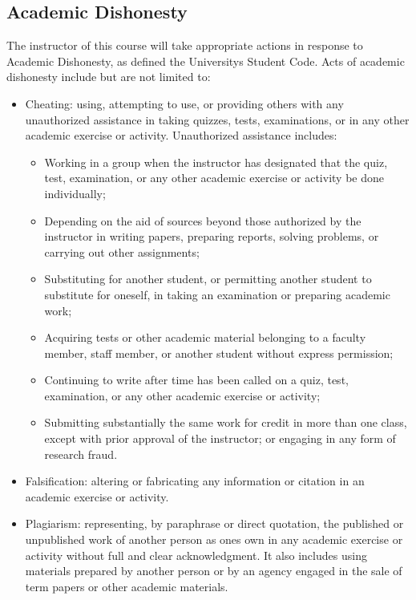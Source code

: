 \documentclass[11pt,]{article}
\providecommand{\tightlist}{%
  \setlength{\itemsep}{0pt}\setlength{\parskip}{0pt}}
\begin{document}
\hypertarget{academic-dishonesty}{%
\subsection{Academic Dishonesty}\label{academic-dishonesty}}

The instructor of this course will take appropriate actions in response
to Academic Dishonesty, as defined the Universitys Student Code. Acts of
academic dishonesty include but are not limited to:

\begin{itemize}
\item
  Cheating: using, attempting to use, or providing others with any
  unauthorized assistance in taking quizzes, tests, examinations, or in
  any other academic exercise or activity. Unauthorized assistance
  includes:

  \begin{itemize}
  \tightlist
  \item
    Working in a group when the instructor has designated that the quiz,
    test, examination, or any other academic exercise or activity be
    done individually;
  \item
    Depending on the aid of sources beyond those authorized by the
    instructor in writing papers, preparing reports, solving problems,
    or carrying out other assignments;
  \item
    Substituting for another student, or permitting another student to
    substitute for oneself, in taking an examination or preparing
    academic work;
  \item
    Acquiring tests or other academic material belonging to a faculty
    member, staff member, or another student without express permission;
  \item
    Continuing to write after time has been called on a quiz, test,
    examination, or any other academic exercise or activity;
  \item
    Submitting substantially the same work for credit in more than one
    class, except with prior approval of the instructor; or engaging in
    any form of research fraud.
  \end{itemize}
\item
  Falsification: altering or fabricating any information or citation in
  an academic exercise or activity.
\item
  Plagiarism: representing, by paraphrase or direct quotation, the
  published or unpublished work of another person as ones own in any
  academic exercise or activity without full and clear acknowledgment.
  It also includes using materials prepared by another person or by an
  agency engaged in the sale of term papers or other academic materials.
\end{itemize}
\end{document}
